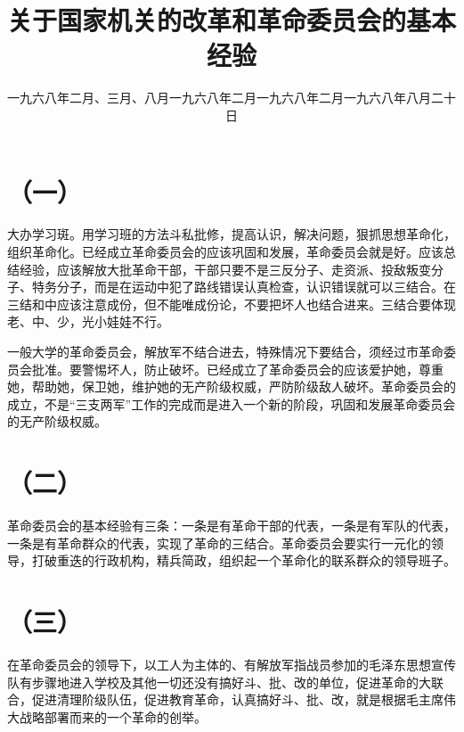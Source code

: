 
\title{关于国家机关的改革和革命委员会的基本经验}
\date{一九六八年二月、三月、八月}
\maketitle


\date{一九六八年二月}
\section*{（一）}

大办学习斑。用学习班的方法斗私批修，提高认识，解决问题，狠抓思想革命化，组织革命化。已经成立革命委员会的应该巩固和发展，革命委员会就是好。应该总结经验，应该解放大批革命干部，干部只要不是三反分子、走资派、投敌叛变分子、特务分子，而是在运动中犯了路线错误认真检查，认识错误就可以三结合。在三结和中应该注意成份，但不能唯成份论，不要把坏人也结合进来。三结合要体现老、中、少，光小娃娃不行。

一般大学的革命委员会，解放军不结合进去，特殊情况下要结合，须经过市革命委员会批准。要警惕坏人，防止破坏。已经成立了革命委员会的应该爱护她，尊重她，帮助她，保卫她，维护她的无产阶级权威，严防阶级敌人破坏。革命委员会的成立，不是“三支两军”工作的完成而是进入一个新的阶段，巩固和发展革命委员会的无产阶级权威。

\date{一九六八年二月}
\section*{（二）}

革命委员会的基本经验有三条：一条是有革命干部的代表，一条是有军队的代表，一条是有革命群众的代表，实现了革命的三结合。革命委员会要实行一元化的领导，打破重迭的行政机构，精兵简政，组织起一个革命化的联系群众的领导班子。

\date{一九六八年八月二十日}
\section*{（三）}

在革命委员会的领导下，以工人为主体的、有解放军指战员参加的毛泽东思想宣传队有步骤地进入学校及其他一切还没有搞好斗、批、改的单位，促进革命的大联合，促进清理阶级队伍，促进教育革命，认真搞好斗、批、改，就是根据毛主席伟大战略部署而来的一个革命的创举。

